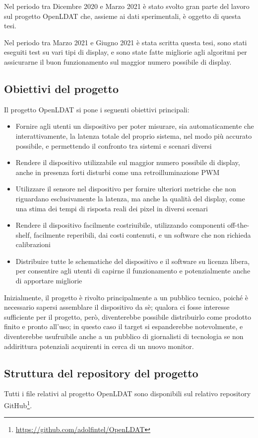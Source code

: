 Nel periodo tra Dicembre 2020 e Marzo 2021 è stato svolto gran parte del lavoro sul progetto OpenLDAT che, assieme ai dati sperimentali, è oggetto di questa tesi.

Nel periodo tra Marzo 2021 e Giugno 2021 è stata scritta questa tesi, sono stati eseguiti test su vari tipi di display, e sono state fatte migliorie agli algoritmi per assicurarne il buon funzionamento sul maggior numero possibile di display.

\subsection{Obiettivi del progetto}
Il progetto OpenLDAT si pone i seguenti obiettivi principali:
\begin{itemize}
	\item Fornire agli utenti un dispositivo per poter misurare, sia automaticamente che interattivamente, la latenza totale del proprio sistema, nel modo più accurato possibile, e permettendo il confronto tra sistemi e scenari diversi
	\item Rendere il dispositivo utilizzabile sul maggior numero possibile di display, anche in presenza forti disturbi come una retroilluminazione PWM
	\item Utilizzare il sensore nel dispositivo per fornire ulteriori metriche che non riguardano esclusivamente la latenza, ma anche la qualità del display, come una stima dei tempi di risposta reali dei pixel in diversi scenari
	\item Rendere il dispositivo facilmente costriuibile, utilizzando componenti off-the-shelf, facilmente reperibili, dai costi contenuti, e un software che non richieda calibrazioni
	\item Distribuire tutte le schematiche del dispositivo e il software su licenza libera, per consentire agli utenti di capirne il funzionamento e potenzialmente anche di apportare migliorie
\end{itemize}

Inizialmente, il progetto è rivolto principalmente a un pubblico tecnico, poiché è necessario sapersi assemblare il dispositivo da sè; qualora ci fosse interesse sufficiente per il progetto, però, diventerebbe possibile distribuirlo come prodotto finito e pronto all'uso; in questo caso il target si espanderebbe notevolmente, e diventerebbe usufruibile anche a un pubblico di giornalisti di tecnologia se non addirittura potenziali acquirenti in cerca di un nuovo monitor.

\subsection{Struttura del repository del progetto}
Tutti i file relativi al progetto OpenLDAT sono disponibili sul relativo repository GitHub\footnote{\href{https://github.com/adolfintel/OpenLDAT}{https://github.com/adolfintel/OpenLDAT}}. %

